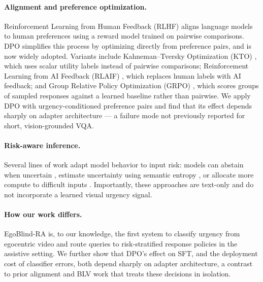 \documentclass{article}
\begin{document}
\paragraph{Alignment and preference optimization.}
Reinforcement Learning from Human Feedback (RLHF) \cite{ouyang2022instructgpt} aligns language models to human preferences using a reward model trained on pairwise comparisons. DPO \cite{rafailov2023dpo} simplifies this process by optimizing directly from preference pairs, and is now widely adopted. Variants include Kahneman--Tversky Optimization (KTO) \cite{ethayarajh2024kto}, which uses scalar utility labels instead of pairwise comparisons; Reinforcement Learning from AI Feedback (RLAIF) \cite{lee2023rlaif}, which replaces human labels with AI feedback; and Group Relative Policy Optimization (GRPO) \cite{shao2024deepseekmath}, which scores groups of sampled responses against a learned baseline rather than pairwise. We apply DPO with urgency-conditioned preference pairs and find that its effect depends sharply on adapter architecture --- a failure mode not previously reported for short, vision-grounded VQA.

\paragraph{Risk-aware inference.}
Several lines of work adapt model behavior to input risk: models can abstain when uncertain \cite{whitehead2022reliable}, estimate uncertainty using semantic entropy \cite{kuhn2023semantic}, or allocate more compute to difficult inputs \cite{schuster2022confident}. Importantly, these approaches are text-only and do not incorporate a learned visual urgency signal.

\paragraph{How our work differs.}
EgoBlind-RA is, to our knowledge, the first system to classify urgency from egocentric video and route queries to risk-stratified response policies in the assistive setting. We further show that DPO's effect on SFT, and the deployment cost of classifier errors, both depend sharply on adapter architecture, a contrast to prior alignment and BLV work that treats these decisions in isolation.
\end{document}
